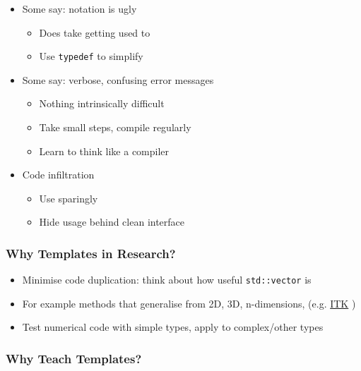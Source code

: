 \begin{itemize}
\itemsep1pt\parskip0pt
\item
  Some say: notation is ugly

  \begin{itemize}
  \itemsep1pt\parskip0pt
  \item
    Does take getting used to
  \item
    Use \texttt{typedef} to simplify
  \end{itemize}
\item
  Some say: verbose, confusing error messages

  \begin{itemize}
  \itemsep1pt\parskip0pt
  \item
    Nothing intrinsically difficult
  \item
    Take small steps, compile regularly
  \item
    Learn to think like a compiler
  \end{itemize}
\item
  Code infiltration

  \begin{itemize}
  \itemsep1pt\parskip0pt
  \item
    Use sparingly
  \item
    Hide usage behind clean interface
  \end{itemize}
\end{itemize}

\subsubsection{Why Templates in
Research?}\label{why-templates-in-research}

\begin{itemize}
\itemsep1pt\parskip0pt
\item
  Minimise code duplication: think about how useful \texttt{std::vector}
  is
\item
  For example methods that generalise from 2D, 3D, n-dimensions, (e.g.
  \href{http://www.itk.org}{ITK} )
\item
  Test numerical code with simple types, apply to complex/other types
\end{itemize}

\subsubsection{Why Teach Templates?}\label{why-teach-templates}

